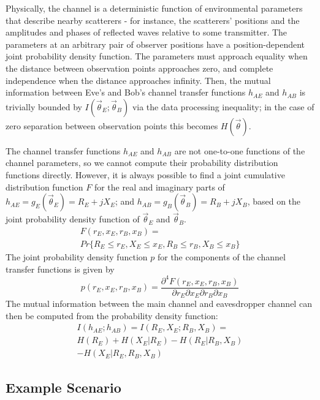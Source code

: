 \documentclass[journal]{ieeetran}
\begin{document}
Physically, the channel is a deterministic function of environmental parameters that describe nearby scatterers - for instance, the scatterers' positions and the amplitudes and phases of reflected waves relative to some transmitter.  The parameters at an arbitrary pair of observer positions have a position-dependent joint probability density function.  The parameters must approach equality when the distance between observation points approaches zero, and complete independence when the distance approaches infinity.
Then, the mutual information between Eve's and Bob's channel transfer functions $h_{AE}$ and $h_{AB}$ is trivially bounded by $I(\vec{\theta}_E;\vec{\theta}_B)$ via the data processing inequality; in the case of zero separation between observation points this becomes $H(\vec{\theta})$.

The channel transfer functions $h_{AE}$ and $h_{AB}$ are not one-to-one functions of the channel parameters, so we cannot compute their probability distribution functions directly.  However, it is always possible to find a joint cumulative distribution function $F$ for the real and imaginary parts of $h_{AE} = g_E(\vec{\theta}_E)=R_E+jX_E$; and $h_{AB}=g_B(\vec{\theta}_B)=R_B+jX_B$, based on the joint probability density function of $\vec{\theta}_E$ and $\vec{\theta}_B$.  
\begin{multline}
F(r_E,x_E,r_B,x_B) = \\Pr\{R_E \leq r_E, X_E \leq x_E, R_B \leq r_B, X_B \leq x_B \}
\end{multline}
The joint probability density function $p$ for the components of the channel transfer functions is given by
\begin{equation}
p(r_E,x_E,r_B, x_B) = \frac{\partial^4 F(r_E,x_E,r_B, x_B)}{\partial r_E \partial x_E \partial r_B \partial x_B}
\end{equation}
The mutual information between the main channel and eavesdropper channel can then be computed from the probability density function:
\begin{multline}
I(h_{AE}; h_{AB}) = I(R_E, X_E; R_B, X_B) = \\
 H(R_E)+H(X_E|R_E) -H(R_E|R_B,X_B) \\- H(X_E|R_E,R_B,X_B)
\end{multline}

\subsection{Example Scenario}
\end{document}
